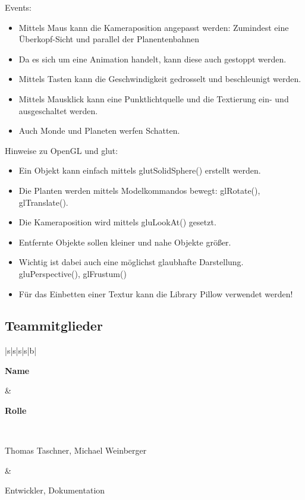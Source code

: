 \documentclass[12pt,a4paper,oneside,ngerman]{scrartcl}
\newcommand{\tabhvent}[1]{\noindent\parbox[c]{\hsize}{#1}}
\begin{document}
Events:

\begin{itemize}
\item Mittels Maus kann die Kameraposition angepasst werden: Zumindest eine Überkopf-Sicht und parallel der Planentenbahnen
\item Da es sich um eine Animation handelt, kann diese auch gestoppt werden.
\item Mittels Tasten kann die Geschwindigkeit gedrosselt und beschleunigt werden.
\item Mittels Mausklick kann eine Punktlichtquelle und die Textierung ein- und ausgeschaltet werden.
\item Auch Monde und Planeten werfen Schatten.
\end{itemize}

Hinweise zu OpenGL und glut:

\begin{itemize}
\item Ein Objekt kann einfach mittels glutSolidSphere() erstellt werden.
\item Die Planten werden mittels Modelkommandos bewegt: glRotate(), glTranslate().
\item Die Kameraposition wird mittels gluLookAt() gesetzt.
\item Entfernte Objekte sollen kleiner und nahe Objekte größer.
\item Wichtig ist dabei auch eine möglichst glaubhafte Darstellung. \newline gluPerspective(), glFrustum()
\item Für das Einbetten einer Textur kann die Library Pillow verwendet werden!
\end{itemize}
\newpage
\subsection{Teammitglieder}
\begin{table}[h]
\renewcommand{\arraystretch}{3.0}
\centering
\begin{tabularx}{\textwidth}{|s|s|s|s|b|}
\hline


\tabhvent{\textbf{Name}} &\tabhvent{\textbf{Rolle}}  \\ \hline

\tabhvent{Thomas Taschner, Michael Weinberger} & \tabhvent{Entwickler, Dokumentation} \\ \hline


\end{tabularx}
\end{table}
\end{document}
